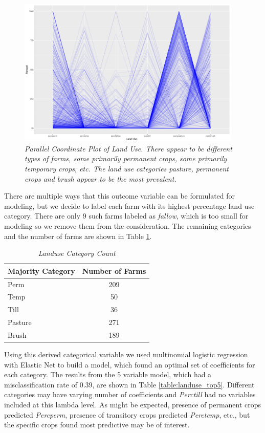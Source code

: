 \documentclass{article}
\begin{document}
\begin{figure}[h!]
\centering
\includegraphics[width = 0.95\textwidth]{landuse_parplot.pdf}
\caption{\textsl{\small Parallel Coordinate Plot of Land Use. There appear to be different types of farms, some primarily permanent crops, some primarily temporary crops, etc. The land use categories pasture, permanent crops and brush appear to be the most prevalent.}}
\label{figure:landuse_plot}
\end{figure}

There are multiple ways that this outcome variable can be formulated for modeling, but we decide to label each farm with its 
highest percentage land use category. There are only 9 such farms labeled as \textit{fallow}, which is too small for modeling so we 
remove them from the consideration. The remaining categories and the number of farms are shown in Table \ref{table:landuse_cat}.

\begin{table}[h]
\centering
\setlength{\abovecaptionskip}{5pt}
\begin{tabular}{lc}
Majority Category    & Number of Farms \\
\hline
Perm    & 209             \\
Temp    & 50              \\
Till    & 36              \\
Pasture & 271             \\
Brush   & 189            
\end{tabular}
\caption{\textsl{\small Landuse Category Count}}
\label{table:landuse_cat}
\end{table}  	

\pagebreak

Using this derived categorical variable we used multinomial logistic regression with Elastic Net to build a model, which found an 
optimal set of coefficients for each category. The results from the 5 variable model, which had a misclassification rate of 0.39, 
are shown in Table \ref{table:landuse_top5}. Different categories may have varying number of coefficients and \textit{Perctill} 
had no variables included at this lambda level. As might be expected, presence of permanent crops predicted \textit{Percperm}, 
presence of transitory crops predicted \textit{Perctemp}, etc., but the specific crops found most predictive may be of interest.
\end{document}
